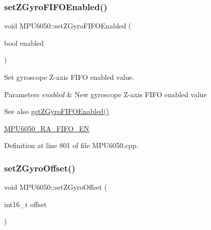 \subsubsection{\texorpdfstring{setZGyroFIFOEnabled()}{setZGyroFIFOEnabled()}}
{\footnotesize\ttfamily void M\+P\+U6050\+::set\+Z\+Gyro\+F\+I\+F\+O\+Enabled (\begin{DoxyParamCaption}\item[{bool}]{enabled }\end{DoxyParamCaption})}

Set gyroscope Z-\/axis F\+I\+FO enabled value. 
\begin{DoxyParams}{Parameters}
{\em enabled} & New gyroscope Z-\/axis F\+I\+FO enabled value \\
\hline
\end{DoxyParams}
\begin{DoxySeeAlso}{See also}
\mbox{\hyperlink{classMPU6050_adbbbd131c74f37dd545403633eb317ff}{get\+Z\+Gyro\+F\+I\+F\+O\+Enabled()}} 

\mbox{\hyperlink{MPU6050_8h_a1166fe50f4792f3266e15dc3273e375d}{M\+P\+U6050\+\_\+\+R\+A\+\_\+\+F\+I\+F\+O\+\_\+\+EN}} 
\end{DoxySeeAlso}


Definition at line 801 of file M\+P\+U6050.\+cpp.


\begin{DoxyCode}{0}

\end{DoxyCode}
\mbox{\label{classMPU6050_aacf6f5599adbfb8ec685f2b96db6905e}} 
\subsubsection{\texorpdfstring{setZGyroOffset()}{setZGyroOffset()}}
{\footnotesize\ttfamily void M\+P\+U6050\+::set\+Z\+Gyro\+Offset (\begin{DoxyParamCaption}\item[{int16\+\_\+t}]{offset }\end{DoxyParamCaption})}



